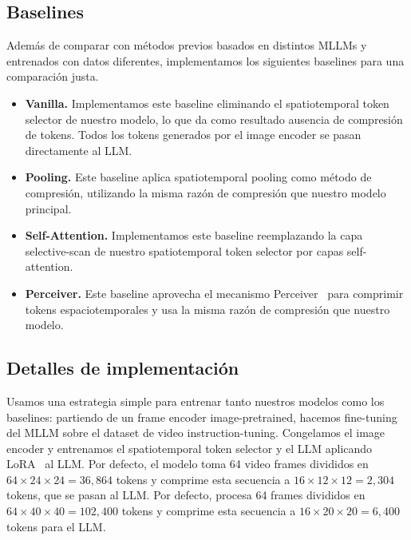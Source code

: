 \subsection{Baselines}

Además de comparar con métodos previos basados en distintos MLLMs y entrenados con datos diferentes, implementamos los siguientes baselines para una comparación justa.

\begin{itemize}

\item \textbf{Vanilla.} Implementamos este baseline eliminando el spatiotemporal token selector de nuestro modelo, lo que da como resultado ausencia de compresión de tokens. Todos los tokens generados por el image encoder se pasan directamente al LLM.

\item \textbf{Pooling.} Este baseline aplica spatiotemporal pooling como método de compresión, utilizando la misma razón de compresión que nuestro modelo principal. 

\item \textbf{Self-Attention.} Implementamos este baseline reemplazando la capa selective-scan de nuestro spatiotemporal token selector por capas self-attention. 

\item \textbf{Perceiver.} Este baseline aprovecha el mecanismo Perceiver~\cite{jaegle2021perceiver} para comprimir tokens espaciotemporales y usa la misma razón de compresión que nuestro modelo.

\end{itemize}



\subsection{Detalles de implementación}

Usamos una estrategia simple para entrenar tanto nuestros modelos como los baselines: partiendo de un frame encoder image-pretrained, hacemos fine-tuning del MLLM sobre el dataset de video instruction-tuning. Congelamos el image encoder y entrenamos el spatiotemporal token selector y el LLM aplicando LoRA~\cite{hu2021lora} al LLM. Por defecto, el modelo \modelLlava toma 64 video frames divididos en $64 \times 24 \times 24 = 36,864$ tokens y comprime esta secuencia a $16 \times 12 \times 12 = 2,304$ tokens, que se pasan al LLM. Por defecto, \modelLlama procesa 64 frames divididos en $64 \times 40 \times 40 = 102,400$ tokens y comprime esta secuencia a $16 \times 20 \times 20 = 6,400$ tokens para el LLM.
